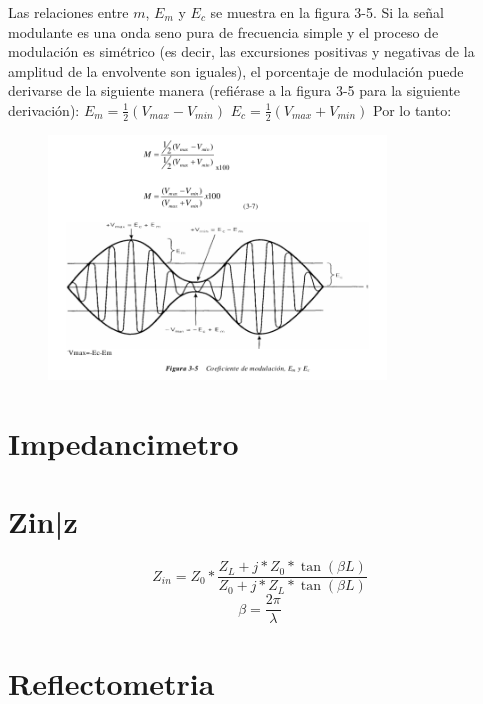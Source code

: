 \documentclass[a4paper,12pt,twoside]{article}
\begin{document}
Las relaciones entre $m$, $E_m$ y $E_c$ se muestra en la figura 3-5.
Si la señal modulante es una onda seno pura de frecuencia simple y el proceso de modulación es simétrico (es decir, las excursiones positivas y negativas de la amplitud de la envolvente son iguales), el porcentaje de modulación puede derivarse de la siguiente manera (refiérase a la figura 3-5 para la siguiente derivación):
\newline
$E_m = \frac{1}{2} (V_{max} - V_{min} )$
\newline
$E_c = \frac{1}{2} (V_{max} + V_{min} )$
\newline
\newline
Por lo tanto:
\begin{figure}[H]
    \centering
    \includegraphics[width=0.8\textwidth]{../img/m.png}
\end{figure}

\section{Impedancimetro}


\section{Zin|z}
\begin{equation*}
Z_{in}=Z_0*\frac{Z_L+j*Z_0*\tan(\beta L)}{Z_0+j*Z_L*\tan(\beta L)}
\end{equation*}
\begin{equation*}
\beta=\frac{2\pi}{\lambda}
\end{equation*}
\section{Reflectometria}
\end{document}
